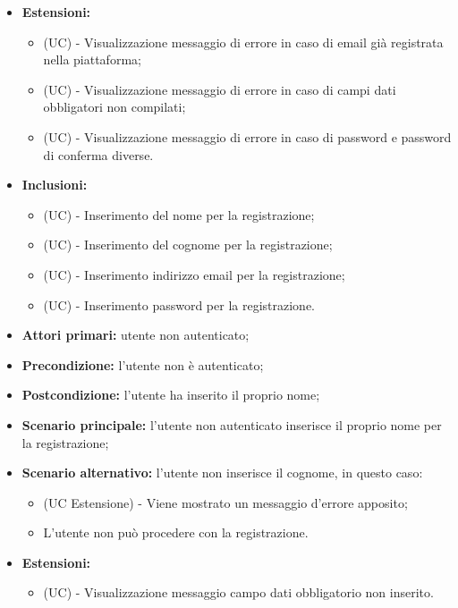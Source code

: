 \begin{itemize}
    \item \textbf{Estensioni:}
    \begin{itemize}
        \item (UC) - Visualizzazione messaggio di errore in caso di email già registrata nella piattaforma;
        \item (UC) - Visualizzazione messaggio di errore in caso di campi dati obbligatori non compilati;
        \item (UC) - Visualizzazione messaggio di errore in caso di password e password di conferma diverse.
    \end{itemize}
	\item \textbf{Inclusioni:}
	\begin{itemize}
		\item (UC) - Inserimento del nome per la registrazione;
		\item (UC) - Inserimento del cognome per la registrazione; 
		\item (UC) - Inserimento indirizzo email per la registrazione;
		\item (UC) - Inserimento password per la registrazione.
	\end{itemize}
\end{itemize}

\begin{itemize}
	\item \textbf{Attori primari:} utente non autenticato;
	\item \textbf{Precondizione:} l'utente non è autenticato;
	\item \textbf{Postcondizione:} l'utente ha inserito il proprio nome;
	\item \textbf{Scenario principale:} l'utente non autenticato inserisce il proprio nome per la registrazione;
	\item \textbf{Scenario alternativo:} l'utente non inserisce il cognome, in questo caso:
	\begin{itemize}
		\item (UC Estensione) - Viene mostrato un messaggio d'errore apposito;
		\item L'utente non può procedere con la registrazione.
	\end{itemize}
	\item \textbf{Estensioni:}
	\begin{itemize}
		\item (UC) - Visualizzazione messaggio campo dati obbligatorio non inserito.
	\end{itemize}
\end{itemize}

